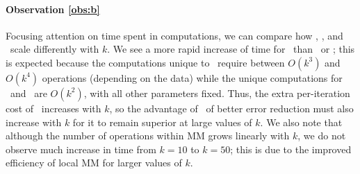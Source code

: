 \paragraph{Observation \ref{obs:b}}
 Focusing attention on time spent in \NLS computations, we can compare how \MU, \HALS, and \BPP\ scale differently with $k$.
 We see a more rapid increase of \NLS time for \BPP\ than \MU\ or \HALS; this is expected because the \NLS computations unique to \BPP\ require between $O(k^3)$ and $O(k^4)$ operations (depending on the data) while the unique \NLS computations for \MU\ and \HALS\ are $O(k^2)$, with all other parameters fixed.
Thus, the extra per-iteration cost of \BPP\ increases with $k$, so the advantage of \BPP\ of better error reduction must also increase with $k$ for it to remain superior at large values of $k$.
We also note that although the number of operations within MM grows linearly with $k$, we do not observe much increase in time from $k=10$ to $k=50$; this is due to the improved efficiency of local MM for larger values of $k$.

